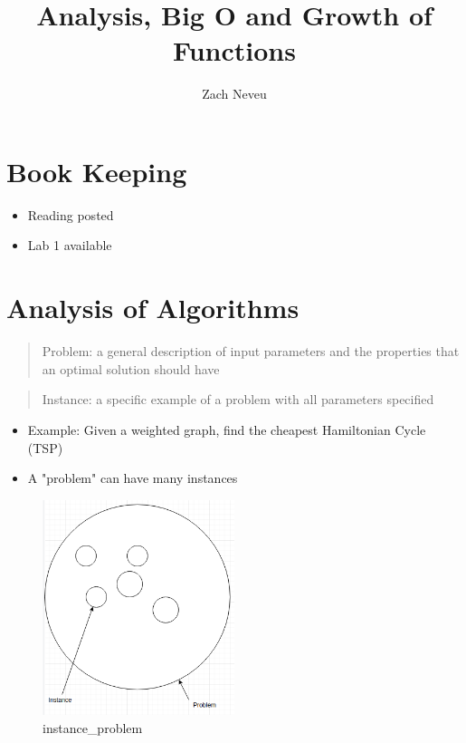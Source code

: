 \documentclass[12pt, letter]{article}
\author{Zach Neveu}
\title{ Analysis, Big O and Growth of Functions }
\begin{document}
\maketitle

\section{Book Keeping}%
\label{sec:book_keeping}
\begin{itemize}
	\item Reading posted
	\item Lab 1 available
\end{itemize}

\section{Analysis of Algorithms}%
\label{sec:analysis_of_algorithms}
\begin{quote}
	Problem: a general description of input parameters and the properties that an optimal solution should have
\end{quote}
\begin{quote}
	Instance: a specific example of a problem with all parameters specified
\end{quote}
\begin{itemize}
	\item Example: Given a weighted graph, find the cheapest Hamiltonian Cycle (TSP)
	\item A "problem" can have many instances
\end{itemize}

\begin{figure}[h]
	\centering
	\includegraphics[width=0.5\textwidth]{imgs/instance_problem}
	\caption{instance\_problem}
	\label{fig:instance_problem}
\end{figure}
\end{document}
